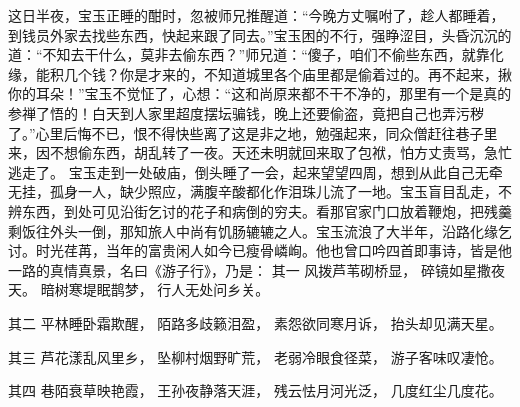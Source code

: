 \documentclass[12pt,oneside]{book}
\begin{document}
这日半夜，宝玉正睡的酣时，忽被师兄推醒道：“今晚方丈嘱咐了，趁人都睡着，到钱员外家去找些东西，快起来跟了同去。”宝玉困的不行，强睁涩目，头昏沉沉的道：“不知去干什么，莫非去偷东西？”师兄道：“傻子，咱们不偷些东西，就靠化缘，能积几个钱？你是才来的，不知道城里各个庙里都是偷着过的。再不起来，揪你的耳朵！”宝玉不觉怔了，心想：“这和尚原来都不干不净的，那里有一个是真的参禅了悟的！白天到人家里超度摆坛骗钱，晚上还要偷盗，竟把自己也弄污秽了。”心里后悔不已，恨不得快些离了这是非之地，勉强起来，同众僧赶往巷子里来，因不想偷东西，胡乱转了一夜。天还未明就回来取了包袱，怕方丈责骂，急忙逃走了。
宝玉走到一处破庙，倒头睡了一会，起来望望四周，想到从此自己无牵无挂，孤身一人，缺少照应，满腹辛酸都化作泪珠儿流了一地。宝玉盲目乱走，不辨东西，到处可见沿街乞讨的花子和病倒的穷夫。看那官家门口放着鞭炮，把残羹剩饭往外头一倒，那知旅人中尚有饥肠辘辘之人。宝玉流浪了大半年，沿路化缘乞讨。时光荏苒，当年的富贵闲人如今已瘦骨嶙峋。他也曾口吟四首即事诗，皆是他一路的真情真景，名曰《游子行》，乃是：
其一 
风拨芦苇砌桥显，
碎镜如星撒夜天。
暗树寒堤眠鹊梦，
行人无处问乡关。 

其二 
平林睡卧霜欺醒，
陌路多歧籁泪盈，
素怨欲同寒月诉，
抬头却见满天星。

其三 
芦花漾乱风里乡，
坠柳村烟野旷荒，
老弱冷眼食径菜，
游子客味叹凄怆。 

其四 
巷陌衰草映艳霞，
王孙夜静落天涯，
残云怯月河光泛，
几度红尘几度花。
\end{document}
